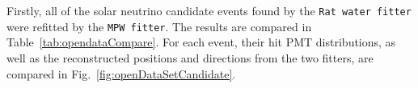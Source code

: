 Firstly, all of the solar neutrino candidate events found by the \texttt{Rat water fitter} were refitted by the \texttt{MPW fitter}. The results are compared in Table~\ref{tab:opendataCompare}. For each event, their hit PMT distributions, as well as the reconstructed positions and directions from the two fitters, are compared in Fig.~\ref{fig:openDataSetCandidate}. 

\begin{figure}[htbp]
	\centering
\end{figure}
